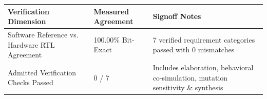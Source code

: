 \documentclass[11pt,a4paper]{article}
\begin{document}
{\small\renewcommand{\arraystretch}{1.18}\begin{longtable}{@{}L{0.38\textwidth}|L{0.22\textwidth}|L{0.32\textwidth}@{}}\toprule

\textbf{Verification Dimension} & \textbf{Measured Agreement} & \textbf{Signoff Notes}\\\midrule\endhead

Software Reference vs. Hardware RTL Agreement & 100.00\% Bit-Exact & 7 verified requirement categories passed with 0 mismatches\\[2pt]\hline

Admitted Verification Checks Passed & 0 /\allowbreak{} 7 & Includes elaboration,\allowbreak{} behavioral co-simulation,\allowbreak{} mutation sensitivity \& synthesis\\[2pt]\hline

\bottomrule\end{longtable}}
\end{document}
